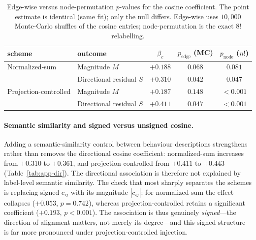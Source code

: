 \begin{table}[h]
  \centering
  \small
  \setlength{\tabcolsep}{5pt}
  \begin{tabular}{llccc}
    \toprule
    scheme & outcome & $\beta_c$ & $p_{\text{edge}}$ (MC) & $p_{\text{node}}$ ($n!$) \\
    \midrule
    Normalized-sum & Magnitude $M$ & $+0.188$ & $0.068$ & $0.081$ \\
                   & Directional residual $S$ & $+0.310$ & $0.042$ & $0.047$ \\
    \midrule
    Projection-controlled & Magnitude $M$ & $+0.187$ & $0.148$ & ${<}0.001$ \\
                   & Directional residual $S$ & $+0.411$ & $0.047$ & ${<}0.001$ \\
    \bottomrule
  \end{tabular}
  \caption{Edge-wise versus node-permutation $p$-values for the cosine coefficient. The point
  estimate is identical (same fit); only the null differs. Edge-wise uses $10{,}000$
  Monte-Carlo shuffles of the cosine entries; node-permutation is the exact $8!$ relabelling.}
  \label{tab:app-null}
\end{table}

\paragraph{Semantic similarity and signed versus unsigned cosine.}
Adding a semantic-similarity control between behaviour descriptions strengthens rather than
removes the directional cosine coefficient: normalized-sum increases from $+0.310$ to $+0.361$,
and projection-controlled from $+0.411$ to $+0.443$ (Table~\ref{tab:app-dir}). The directional
association is therefore not explained by label-level semantic similarity. The check that most
sharply separates the schemes is replacing signed $c_{ij}$ with its magnitude $|c_{ij}|$: for
normalized-sum the effect collapses ($+0.053$, $p=0.742$), whereas projection-controlled
retains a significant coefficient ($+0.193$, $p<0.001$). The association is thus genuinely
\emph{signed}---the direction of alignment matters, not merely its degree---and this signed
structure is far more pronounced under projection-controlled injection.

